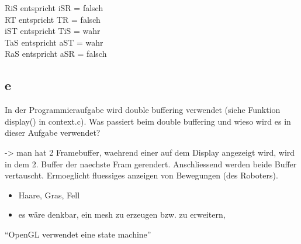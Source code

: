\documentclass[12pt]{scrreprt}
\begin{document}
RiS entspricht iSR = falsch\\
RT entspricht TR   = falsch\\
iST entspricht TiS = wahr\\
TaS entspricht aST = wahr\\
RaS entspricht aSR = falsch\\


\subsection*{e}

In der Programmieraufgabe wird double buffering verwendet (siehe Funktion display() in
context.c). Was passiert beim double buffering und wieso wird es in dieser Aufgabe verwendet?

-> man hat 2 Framebuffer, waehrend einer auf dem Display angezeigt wird, wird in dem 2. Buffer der naechste Fram gerendert. Anschliessend werden beide Buffer vertauscht. Ermoeglicht fluessiges anzeigen von Bewegungen (des Roboters).



\begin{itemize}
  \item Haare, Gras, Fell
  \item es wäre denkbar, ein mesh zu erzeugen bzw. zu erweitern,
\end{itemize}


``OpenGL verwendet eine state machine''
\end{document}
